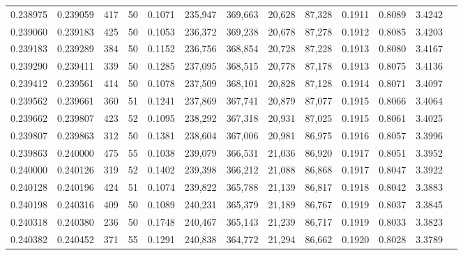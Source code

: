 \begin{tabular}{rrrrrrrrrrrrr}
0.238975 & 0.239059 &   417 &  50 &                                     0.1071 & 235,947 & 369,663 &  20,628 &  87,328 & 0.1911 & 0.8089 & 3.4242 \\
0.239060 & 0.239183 &   425 &  50 &                                     0.1053 & 236,372 & 369,238 &  20,678 &  87,278 & 0.1912 & 0.8085 & 3.4203 \\
0.239183 & 0.239289 &   384 &  50 &                                     0.1152 & 236,756 & 368,854 &  20,728 &  87,228 & 0.1913 & 0.8080 & 3.4167 \\
0.239290 & 0.239411 &   339 &  50 &                                     0.1285 & 237,095 & 368,515 &  20,778 &  87,178 & 0.1913 & 0.8075 & 3.4136 \\
0.239412 & 0.239561 &   414 &  50 &                                     0.1078 & 237,509 & 368,101 &  20,828 &  87,128 & 0.1914 & 0.8071 & 3.4097 \\
0.239562 & 0.239661 &   360 &  51 &                                     0.1241 & 237,869 & 367,741 &  20,879 &  87,077 & 0.1915 & 0.8066 & 3.4064 \\
0.239662 & 0.239807 &   423 &  52 &                                     0.1095 & 238,292 & 367,318 &  20,931 &  87,025 & 0.1915 & 0.8061 & 3.4025 \\
0.239807 & 0.239863 &   312 &  50 &                                     0.1381 & 238,604 & 367,006 &  20,981 &  86,975 & 0.1916 & 0.8057 & 3.3996 \\
0.239863 & 0.240000 &   475 &  55 &                                     0.1038 & 239,079 & 366,531 &  21,036 &  86,920 & 0.1917 & 0.8051 & 3.3952 \\
0.240000 & 0.240126 &   319 &  52 &                                     0.1402 & 239,398 & 366,212 &  21,088 &  86,868 & 0.1917 & 0.8047 & 3.3922 \\
0.240128 & 0.240196 &   424 &  51 &                                     0.1074 & 239,822 & 365,788 &  21,139 &  86,817 & 0.1918 & 0.8042 & 3.3883 \\
0.240198 & 0.240316 &   409 &  50 &                                     0.1089 & 240,231 & 365,379 &  21,189 &  86,767 & 0.1919 & 0.8037 & 3.3845 \\
0.240318 & 0.240380 &   236 &  50 &                                     0.1748 & 240,467 & 365,143 &  21,239 &  86,717 & 0.1919 & 0.8033 & 3.3823 \\
0.240382 & 0.240452 &   371 &  55 &                                     0.1291 & 240,838 & 364,772 &  21,294 &  86,662 & 0.1920 & 0.8028 & 3.3789 \\

\end{tabular}
